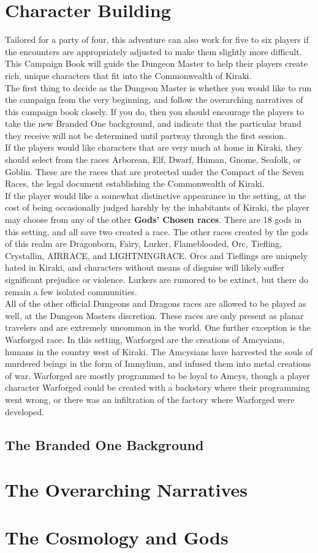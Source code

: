 \section{Character Building}
Tailored for a party of four, this adventure can also work for five to six players if the encounters are appropriately adjusted to make them slightly more difficult. This Campaign Book will guide the Dungeon Master to help their players create rich, unique characters that fit into the Commonwealth of Kiraki. \\
The first thing to decide as the Dungeon Master is whether you would like to run the campaign from the very beginning, and follow the overarching narratives of this campaign book closely. If you do, then you should encourage the players to take the new Branded One background, and indicate that the particular brand they receive will not be determined until partway through the first session.\\
If the players would like characters that are very much at home in Kiraki, they should select from the races Arborean, Elf, Dwarf, Human, Gnome, Seafolk, or Goblin. These are the races that are protected under the Compact of the Seven Races, the legal document establishing the Commonwealth of Kiraki. \\
If the player would like a somewhat distinctive appearance in the setting, at the cost of being occasionally judged harshly by the inhabitants of Kiraki, the player may choose from any of the other \textbf{Gods' Chosen races}. There are 18 gods in this setting, and all save two created a race. The other races created by the gods of this realm are Dragonborn, Fairy, Lurker, Flameblooded, Orc, Tiefling, Crystallin, AIRRACE, and LIGHTNINGRACE. Orcs and Tieflings are uniquely hated in Kiraki, and characters without means of disguise will likely suffer significant prejudice or violence. Lurkers are rumored to be extinct, but there do remain a few isolated communities.\\
All of the other official Dungeons and Dragons races are allowed to be played as well, at the Dungeon Masters discretion. These races are only present as planar travelers and are extremely uncommon in the world. One further exception is the Warforged race. In this setting, Warforged are the creations of Amcysians, humans in the country west of Kiraki. The Amcysians have harvested the souls of murdered beings in the form of Immylium, and infused them into metal creations of war. Warforged are mostly programmed to be loyal to Amcys, though a player character Warforged could be created with a backstory where their programming went wrong, or there was an infiltration of the factory where Warforged were developed.
\subsection{The Branded One Background}

\section{The Overarching Narratives}
\section{The Cosmology and Gods}

